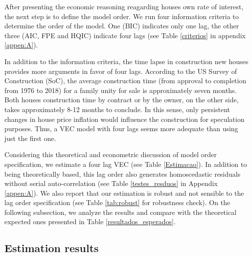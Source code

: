 \documentclass[12pt, a4paper]{article}
\begin{document}
After presenting the economic reasoning reagarding houses own rate of interest,  the next step is to define the model order.
We run four information criteria to determine the order of the model.
One (BIC) indicates only one lag, the other three (AIC, FPE and HQIC) indicate four lags (see Table \ref{criterios} in appendix \ref{appen:A}).

In addition to the information criteria, the time lapse in construction new houses provides more arguments in favor of four lags.
According to the US Survey of Construction (SoC), the average construction time (from approval to completion from 1976 to 2018) for a family unity for sale is approximately seven months.
Both houses construction time by contract or by the owner, on the other side, takes approximately 8-12 months to conclude.
In this sense, only persistent changes in house price inflation would influence the construction for speculation purposes.
Thus, a VEC model with four lags seems more adequate than using just the first one.


Considering this theoretical and econometric discussion of model order specification, we estimate a four lag VEC  (see Table \ref{Estimacao}).
In addition to being theoretically based, this lag order also generates homoscedastic residuals without serial auto-correlation (see Table \ref{testes_resduos} in Appendix \ref{appen:A}).
We also report that our estimation is robust and not sensible to the lag order specification (see Table \ref{tab:robust} for robustness check).
On the following subsection, we analyze the results and compare with the theoretical expected ones presented in Table \ref{resultados_esperados}.


\subsection{Estimation results}
\label{sec:org012bfb7}
\label{sec:results}
\end{document}
